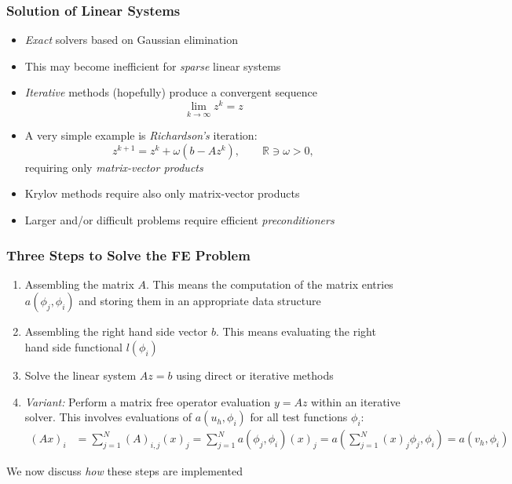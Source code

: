\documentclass[aspectratio=169,11pt]{beamer}
\theoremstyle{definition}
\begin{document}
\begin{frame}
\frametitle{Solution of Linear Systems}
\begin{itemize}
\item {\em Exact} solvers based on Gaussian elimination
\item This may become inefficient for {\em sparse} linear systems
\item {\em Iterative} methods (hopefully) produce a convergent sequence
$$\lim_{k\to\infty} z^k = z$$
\item A very simple example is {\em Richardson's} iteration:
$$ z^{k+1} = z^{k} + \omega (b-Az^{k}), \qquad \mathbb{R}\ni \omega > 0,$$
requiring only {\em matrix-vector products}
\item Krylov methods require also only matrix-vector products
\item Larger and/or difficult problems require efficient \textit{preconditioners}
\end{itemize}
\end{frame}

\begin{frame}
\frametitle{Three Steps to Solve the FE Problem}
\begin{enumerate}
\item Assembling the matrix $A$. This means the computation of the matrix
entries $a(\phi_j,\phi_i)$ and storing them in an appropriate data structure
\item Assembling the right hand side vector $b$. This means evaluating
the right hand side functional $l(\phi_i)$
\item Solve the linear system $Az=b$ using direct or iterative methods
\item {\em Variant:} Perform a matrix free operator evaluation $y=Az$ within an iterative solver. This involves evaluations
of $a(u_h,\phi_i)$ for all test functions $\phi_i$:
\begin{align*}
(Ax)_i &= \sum_{j=1}^N (A)_{i,j} (x)_j = \sum_{j=1}^N a(\phi_j,\phi_i) (x)_j = a\left(\sum_{j=1}^N (x)_j\phi_j,\phi_i\right) = a(v_h,\phi_i)
\end{align*}
\end{enumerate}
We now discuss {\em how} these steps are implemented
\end{frame}
\end{document}
